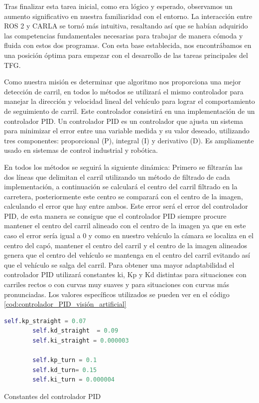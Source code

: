 Tras finalizar esta tarea inicial, como era lógico y esperado, observamos un aumento significativo en nuestra familiaridad con el entorno. La interacción entre ROS 2 y CARLA se tornó  más intuitiva, resaltando así que se habían adquirido las competencias fundamentales necesarias para trabajar de manera cómoda y fluida con estos dos programas. Con esta base establecida, nos encontrábamos en una posición óptima para empezar con el desarrollo de las tareas principales del \ac{TFG}.

\bigskip

Como nuestra misión es determinar que algoritmo nos proporciona una mejor detección de carril, en todos lo métodos se utilizará el mismo controlador para manejar la dirección y velocidad lineal del vehículo para lograr el comportamiento de seguimiento de carril. Este controlador consistirá en una implementación de un controlador \ac{PID}. Un controlador \ac{PID} es un controlador que ajusta un sistema para minimizar el error entre una variable medida y su valor deseado, utilizando tres componentes: proporcional (P), integral (I) y derivativo (D). Es ampliamente usado en sistemas de control industrial y robótica.

\bigskip

 En todos los métodos se seguirá la siguiente dinámica: Primero se filtrarán las dos líneas que delimitan el carril utilizando un método de filtrado de cada implementación, a continuación se calculará el centro del carril filtrado en la carretera, posteriormente este centro se comparará con el centro de la imagen, calculando el error que hay entre ambos. Este error será el error del controlador \ac{PID}, de esta manera se consigue que el controlador \ac{PID} siempre procure mantener el centro del carril alineado con el centro de la imagen ya que en este caso el error sería igual a 0 y como en nuestro vehículo la cámara se localiza en el centro del capó, mantener el centro del carril y el centro de la imagen alineados genera que el centro del vehículo se mantenga en el centro del carril evitando así que el vehículo se salga del carril. Para obtener una mayor adaptabilidad el controlador \ac{PID} utilizará constantes ki, Kp y Kd distintas para situaciones con carriles rectos o con curvas muy suaves y para situaciones con curvas más pronunciadas. Los valores específicos utilizados se pueden ver en el código \ref{cod:controlador_PID_visión_artificial}

\begin{code}[H]
	\begin{lstlisting}[language=Python]
        self.kp_straight = 0.07
        self.kd_straight  = 0.09
        self.ki_straight = 0.000003
        
        self.kp_turn = 0.1
        self.kd_turn= 0.15
        self.ki_turn = 0.000004
	\end{lstlisting}
\caption[Constantes del controlador PID]{Constantes del controlador PID}
\label{cod:controlador_PID_visión_artificial}
\end{code}

